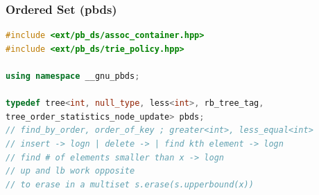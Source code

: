 \subsubsection{Ordered Set (pbds)}
\begin{lstlisting}[style=mystyle, language=C++]
#include <ext/pb_ds/assoc_container.hpp>
#include <ext/pb_ds/trie_policy.hpp>

using namespace __gnu_pbds;

typedef tree<int, null_type, less<int>, rb_tree_tag,
tree_order_statistics_node_update> pbds;
// find_by_order, order_of_key ; greater<int>, less_equal<int>
// insert -> logn | delete -> | find kth element -> logn
// find # of elements smaller than x -> logn
// up and lb work opposite
// to erase in a multiset s.erase(s.upperbound(x))
\end{lstlisting}
